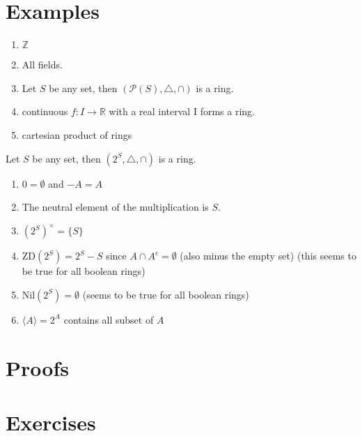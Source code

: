 \section{Examples}

\begin{exmp}
    \begin{enumerate}
        \item \(\mathbb{Z}\)
        \item All fields.
        \item Let \(S\) be any set, then \((\mathcal{P}(S), \triangle, \cap)\) is a ring.
        \item continuous \(f: I \longrightarrow \mathbb{R}\) with a real interval I forms a ring.
        \item cartesian product of rings
    \end{enumerate}
\end{exmp}

\begin{exmp}
    Let \(S\) be any set, then \((2^S, \triangle, \cap)\) is a ring.
    \begin{enumerate}
        \item \(0 = \emptyset\) and \(-A = A\)
        \item The neutral element of the multiplication is \(S\).
        \item \((2^S)^\times = \{S\}\)
        \item \(\mathrm{ZD}(2^S) = 2^S - S\) since \(A \cap A^c = \emptyset\) (also minus the empty set) (this seems to be true for all boolean rings)
        \item \(\mathrm{Nil}(2^S) = \emptyset\) (seems to be true for all boolean rings)
        \item \(\langle A \rangle = 2^A\) contains all subset of \(A\)
    \end{enumerate}
\end{exmp}

\section{Proofs}

\section{Exercises}
